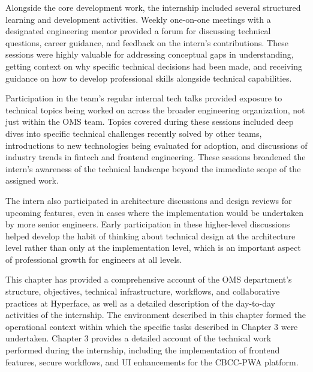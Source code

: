 Alongside the core development work, the internship included several structured learning and development activities. Weekly one-on-one meetings with a designated engineering mentor provided a forum for discussing technical questions, career guidance, and feedback on the intern's contributions. These sessions were highly valuable for addressing conceptual gaps in understanding, getting context on why specific technical decisions had been made, and receiving guidance on how to develop professional skills alongside technical capabilities.

Participation in the team's regular internal tech talks provided exposure to technical topics being worked on across the broader engineering organization, not just within the OMS team. Topics covered during these sessions included deep dives into specific technical challenges recently solved by other teams, introductions to new technologies being evaluated for adoption, and discussions of industry trends in fintech and frontend engineering. These sessions broadened the intern's awareness of the technical landscape beyond the immediate scope of the assigned work.

The intern also participated in architecture discussions and design reviews for upcoming features, even in cases where the implementation would be undertaken by more senior engineers. Early participation in these higher-level discussions helped develop the habit of thinking about technical design at the architecture level rather than only at the implementation level, which is an important aspect of professional growth for engineers at all levels.

This chapter has provided a comprehensive account of the OMS department's structure, objectives, technical infrastructure, workflows, and collaborative practices at Hyperface, as well as a detailed description of the day-to-day activities of the internship. The environment described in this chapter formed the operational context within which the specific tasks described in Chapter 3 were undertaken. Chapter 3 provides a detailed account of the technical work performed during the internship, including the implementation of frontend features, secure workflows, and UI enhancements for the CBCC-PWA platform.
